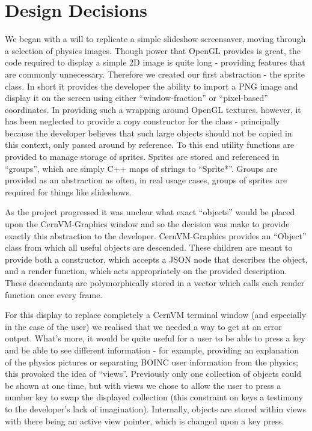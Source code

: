 \documentclass[twocolumn,aps]{revtex4}
\newcommand{\cernvm}{CernVM}
\newcommand{\cernvmgraphics}{\cernvm{}-Graphics}
\newcommand{\boinc}{BOINC}
\newcommand{\opengl}{OpenGL}
\newcommand{\json}{JSON}
\begin{document}
  \section{ Design Decisions }
    We began with a will to replicate a simple slideshow screensaver, moving
    through a selection of physics images. Though power that \opengl{} 
    provides is great, the code required to display a simple 2D image is 
    quite long - providing features that are commonly unnecessary. 
    Therefore we created our first abstraction - the sprite class. In short 
    it provides the developer the ability to import a PNG image and display 
    it on the screen using either ``window-fraction'' or ``pixel-based'' 
    coordinates. In providing such a wrapping around \opengl{} textures, 
    however, it has been neglected to provide a copy constructor for the 
    class - principally because the developer believes that such large 
    objects should not be copied in this context, only passed around by 
    reference. To this end utility functions are provided to manage storage 
    of sprites. Sprites are stored and referenced in ``groups'', which are
    simply C++ maps of strings to ``Sprite*''. Groups are provided as an
    abstraction as often, in real usage cases, groups of sprites are
    required for things like slideshows.

    As the project progressed it was unclear what exact ``objects'' would be
    placed upon the \cernvmgraphics{} window and so the decision was make
    to provide exactly this abstraction to the developer. \cernvmgraphics{}
    provides an ``Object'' class from which all useful objects are
    descended. These children are meant to provide both a constructor, which
    accepts a \json{} node that describes the object, and a render function,
    which acts appropriately on the provided description. These
    descendants are polymorphically stored in a vector which calls each
    render function once every frame.

    For this display to replace completely a \cernvm{} terminal window (and 
    especially in the case of the user) we realised that we needed a way to 
    get at an error output. What's more, it would be quite useful for a 
    user to be able to press a key and be able to see different information
    - for example, providing an explanation of the physics pictures or
    separating \boinc{} user information from the physics; this provoked the
    idea of ``views''. Previously only one collection of objects  could be 
    shown at one time, but with views we chose to allow the user to press
    a number key to swap the displayed collection (this constraint on keys a
    testimony to the developer's lack of imagination). Internally, objects
    are stored within views with there being an active view pointer, which
    is changed upon a key press.
\end{document}
